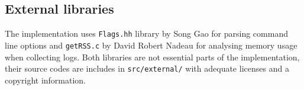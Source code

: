 \subsection{External libraries}

The implementation uses \texttt{Flags.hh} library by Song Gao for parsing command line options and \texttt{getRSS.c} by David Robert Nadeau for analysing memory usage when collecting logs. Both libraries are not essential parts of the implementation, their source codes are includes in \texttt{src/external/} with adequate licenses and a copyright information. 

